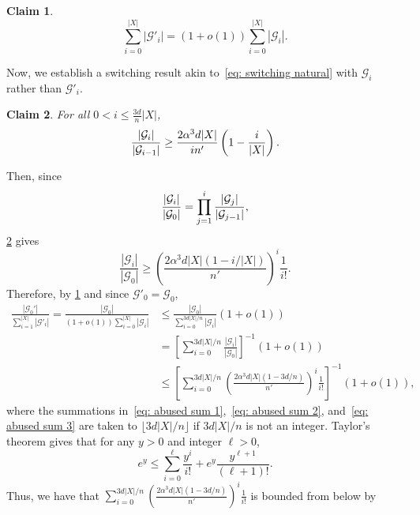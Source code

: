 \documentclass[11pt]{article}
\theoremstyle{plain}
\newtheorem{claim}{Claim}[thm]
\begin{document}
    \begin{claim}\label{clm: chi degree}
        \[
        \sum_{i = 0}^{|X|}|\mathcal G'_i| = (1 + o(1))\sum_{i = 0}^{|X|}|\mathcal G_i|.
        \]
    \end{claim}

    Now, we establish a switching result akin to~\eqref{eq: switching natural} with $\mathcal G_i$ rather than $\mathcal G'_i$.
    
    \begin{claim}\label{clm: switching}
        For all $0 < i \leq \frac{3d}{n}|X|$, 
        \begin{equation}
        \frac{|\mathcal G_i|}{|\mathcal G_{i-1}|} \geq \frac{2\alpha^3d|X|}{in'}\left(1 - \frac{i}{|X|}\right).\notag
    \end{equation}
    \end{claim}
    Then, since 
    \begin{equation}
        \frac{|\mathcal G_i|}{|\mathcal G_0|} = \prod_{j = 1}^{i}\frac{|\mathcal G_{j}|}{|\mathcal G_{j-1}|}, \notag
    \end{equation}
    \cref{clm: switching} gives 
    \begin{equation}\label{eq: d0/di}
        \frac{|\mathcal G_i|}{|\mathcal G_0|} \geq \left(\frac{2\alpha^3d|X|(1 - i/|X|)}{n'}\right)^{i}\frac{1}{i!}.
    \end{equation}
    Therefore, by \cref{clm: chi degree} and since $\mathcal G'_0 = \mathcal G_0$,
    \begin{align}
       \frac{|\mathcal G_0'|}{\sum_{i = 1}^{|X|}|\mathcal G'_i|} = \frac{|\mathcal G_0|}{(1 + o(1))\sum_{i = 0}^{|X|}|\mathcal G_i|} &\leq \frac{|\mathcal G_0|}{\sum_{i = 0}^{3d|X|/n}|\mathcal G_i|}(1 + o(1)) \label{eq: abused sum 1}\\
        &= \left[ \sum_{i = 0}^{ 3d|X|/n}  \frac{|\mathcal G_i|}{|\mathcal G_0|}\right]^{-1}(1 + o(1))\label{eq: abused sum 2}\\
        &\leq \left[ \sum_{i = 0}^{3d|X|/n} \left(\frac{2\alpha^3d|X|\left(1 - 3d/n\right)}{n'}\right)^i\frac{1}{i!} \right]^{-1}(1 + o(1)),\label{eq: abused sum 3}
    \end{align}
    where the summations in~\eqref{eq: abused sum 1},~\eqref{eq: abused sum 2}, and~\eqref{eq: abused sum 3} are taken to $\lfloor 3d|X|/n\rfloor$ if $3d|X|/n$ is not an integer. Taylor's theorem gives that for any $y > 0$ and integer $\ell > 0$, 
    \[
    e^y \leq \sum_{i = 0}^\ell\frac{y^i}{i!} + e^y\frac{y^{\ell + 1}}{(\ell + 1)!}.
    \]
    Thus, we have that $ \sum_{i = 0}^{3d|X|/n}\left(\frac{2\alpha^3d|X|(1 - 3d/n)}{n'}\right)^i\frac{1}{i!} $ is bounded from below by
\end{document}
